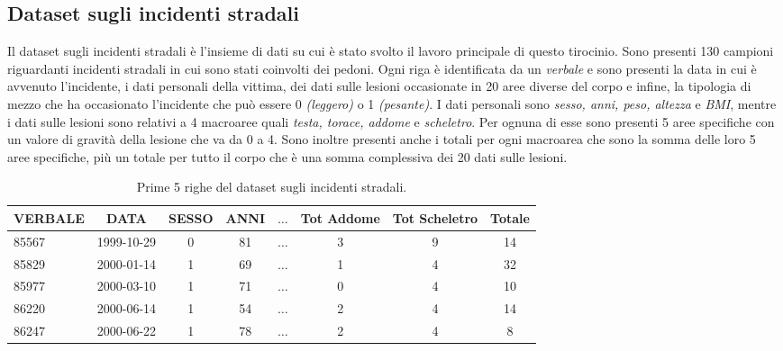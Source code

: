 \documentclass[12pt, twoside, letterpaper]{report}
\begin{document}
			
		\subsection{Dataset sugli incidenti stradali} \label{sec:incidenti}
			Il dataset sugli incidenti stradali è l'insieme di dati su cui è stato svolto il lavoro principale di questo tirocinio. Sono presenti 130 campioni riguardanti incidenti stradali in cui sono stati coinvolti dei pedoni. Ogni riga è identificata da un \textit{verbale} e sono presenti la data in cui è avvenuto l'incidente, i dati personali della vittima, dei dati sulle lesioni occasionate in 20 aree diverse del corpo e infine, la tipologia di mezzo che ha occasionato l'incidente che può essere 0 \textit{(leggero)} o 1 \textit{(pesante)}. I dati personali sono \textit{sesso, anni, peso, altezza} e \textit{BMI}, mentre i dati sulle lesioni sono relativi a 4 macroaree quali \textit{testa, torace, addome} e \textit{scheletro}. Per ognuna di esse sono presenti 5 aree specifiche con un valore di gravità della lesione che va da 0 a 4. Sono inoltre presenti anche i totali per ogni macroarea che sono la somma delle loro 5 aree specifiche, più un totale per tutto il corpo che è una somma complessiva dei 20 dati sulle lesioni. 
			\begin{table}[h]
			\begin{tabular}{lccccccc}
			\toprule
			VERBALE & DATA &  SESSO &  ANNI & $\dots$ &  Tot Addome &  Tot Scheletro &  Totale \\
			\midrule
			85567 & 1999-10-29 &      0 &    81 &  $\dots$ &         3 &              9 &      14 \\
			85829 & 2000-01-14 &      1 &    69 &  $\dots$ &         1 &              4 &      32 \\
			85977 & 2000-03-10 &      1 &    71 &  $\dots$ &         0 &              4 &      10 \\
			86220 & 2000-06-14 &      1 &    54 &  $\dots$ &         2 &              4 &      14 \\
			86247 & 2000-06-22 &      1 &    78 &  $\dots$ &         2 &              4 &       8 \\
			\bottomrule
			\end{tabular}
			\caption{\label{tab:incidenti}Prime 5 righe del dataset sugli incidenti stradali.}
			\end{table}
			
\end{document}
